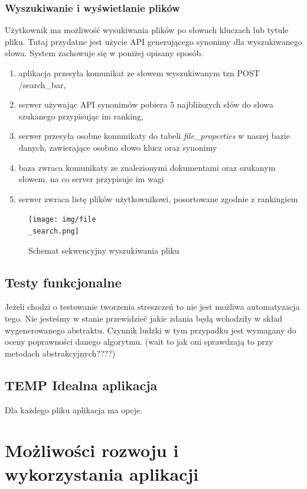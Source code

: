\documentclass[12pt,a4paper,twoside]{article}
\begin{document}
\subsubsection*{Wyszukiwanie i wyświetlanie plików}
Użytkownik ma możliwość wysukiwania plików po słowach kluczach lub tytule pliku. Tutaj przydatne jest użycie API generującego synonimy dla wyszukiwanego słowa. System zachowuje się w poniżej opisany sposób.
\begin{enumerate}
	\item aplikacja przesyła komunikat ze słowem wyszukiwanym tzn POST /search\_bar,
	\item serwer używając API synonimów pobiera 5 najbliższych słów do słowa szukanego przypisując im ranking,
	\item serwer przesyła osobne komunikaty do tabeli \textit{file\_properties} w naszej bazie danych, zawierające osobno słowo klucz oraz synonimy
	\item baza zwraca komunikaty ze znalezionymi dokumentami oraz szukanym słowem, na co server przypisuje im wagi
	\item serwer zwraca listę plików użytkownikowi, posortowane zgodnie z rankingiem
\end{enumerate}
\begin{figure}[h]
\centering
  \texttt{[image: img/file\\\_search.png]}
  \caption{Schemat sekwencyjny wyszukiwania pliku}
\end{figure}
\newpage
\subsection{Testy funkcjonalne}
Jeżeli chodzi o testowanie tworzenia streszczeń to nie jest możliwa automatyzacja tego. Nie jesteśmy w stanie przewidzieć jakie zdania będą wchodziły w skład wygenerowanego abstraktu. Czynnik ludzki w tym przypadku jest wymagany do oceny poprawności danego algorytmu. (wait to jak oni sprawdzają to przy metodach abstrakcyjnych????)
\subsection{TEMP Idealna aplikacja}
Dla każdego pliku aplikacja ma opcje. 
\section{Możliwości rozwoju i wykorzystania aplikacji}
\end{document}
